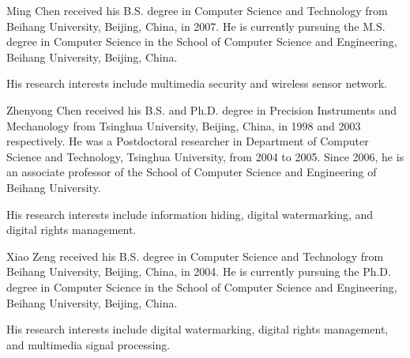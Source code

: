 \documentclass[journal]{IEEEtran}
\begin{document}

%
%
%



\vspace*{-2\baselineskip}
\begin{IEEEbiography}{Ming Chen}
    received his B.S. degree in Computer Science and Technology from Beihang University, Beijing,
    China, in 2007. He is currently pursuing the M.S. degree in Computer Science in the School
    of Computer Science and Engineering, Beihang University, Beijing, China. 

    His research interests include multimedia security and wireless sensor network.
\end{IEEEbiography}
\vspace*{-2\baselineskip}

\begin{IEEEbiography}{Zhenyong Chen}
    received his B.S. and Ph.D. degree in Precision Instruments and Mechanology from Tsinghua
    University, Beijing, China, in 1998 and 2003 respectively. He was a Postdoctoral researcher in
    Department of Computer Science and Technology, Tsinghua University, from 2004 to 2005. Since
    2006, he is an associate professor of the School of Computer Science and Engineering of Beihang
    University. 
    
    His research interests include information hiding, digital watermarking, and digital rights
    management.
\end{IEEEbiography}

\vspace*{-2\baselineskip}

\begin{IEEEbiography}{Xiao Zeng}
    received his B.S. degree in Computer Science and Technology from Beihang University, Beijing,
    China, in 2004. He is currently pursuing the Ph.D. degree in Computer Science in the School
    of Computer Science and Engineering, Beihang University, Beijing, China.

    His research interests include digital watermarking, digital rights management, and multimedia
    signal processing.
\end{IEEEbiography}
\vspace*{-2\baselineskip}
\end{document}
